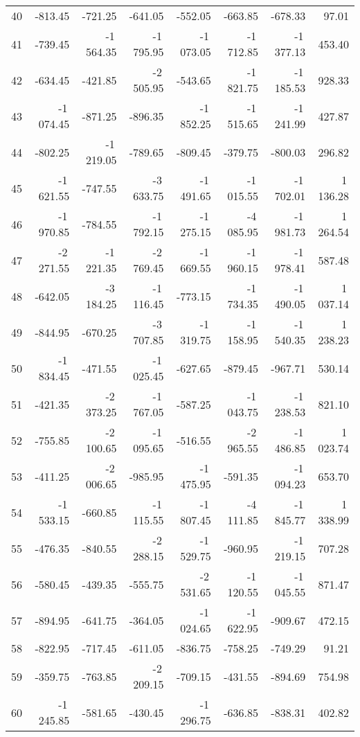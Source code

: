 \begin{longtable}{rrrrrrrr}
40 & -813.45 & -721.25 & -641.05 & -552.05 & -663.85 & -678.33 & 97.01  \\
41 & -739.45 & -1\,564.35 & -1\,795.95 & -1\,073.05 & -1\,712.85 & -1\,377.13 & 453.40  \\
42 & -634.45 & -421.85 & -2\,505.95 & -543.65 & -1\,821.75 & -1\,185.53 & 928.33  \\
43 & -1\,074.45 & -871.25 & -896.35 & -1\,852.25 & -1\,515.65 & -1\,241.99 & 427.87  \\
44 & -802.25 & -1\,219.05 & -789.65 & -809.45 & -379.75 & -800.03 & 296.82  \\
45 & -1\,621.55 & -747.55 & -3\,633.75 & -1\,491.65 & -1\,015.55 & -1\,702.01 & 1\,136.28  \\
46 & -1\,970.85 & -784.55 & -1\,792.15 & -1\,275.15 & -4\,085.95 & -1\,981.73 & 1\,264.54  \\
47 & -2\,271.55 & -1\,221.35 & -2\,769.45 & -1\,669.55 & -1\,960.15 & -1\,978.41 & 587.48  \\
48 & -642.05 & -3\,184.25 & -1\,116.45 & -773.15 & -1\,734.35 & -1\,490.05 & 1\,037.14  \\
49 & -844.95 & -670.25 & -3\,707.85 & -1\,319.75 & -1\,158.95 & -1\,540.35 & 1\,238.23  \\
50 & -1\,834.45 & -471.55 & -1\,025.45 & -627.65 & -879.45 & -967.71 & 530.14  \\
51 & -421.35 & -2\,373.25 & -1\,767.05 & -587.25 & -1\,043.75 & -1\,238.53 & 821.10  \\
52 & -755.85 & -2\,100.65 & -1\,095.65 & -516.55 & -2\,965.55 & -1\,486.85 & 1\,023.74  \\
53 & -411.25 & -2\,006.65 & -985.95 & -1\,475.95 & -591.35 & -1\,094.23 & 653.70  \\
54 & -1\,533.15 & -660.85 & -1\,115.55 & -1\,807.45 & -4\,111.85 & -1\,845.77 & 1\,338.99  \\
55 & -476.35 & -840.55 & -2\,288.15 & -1\,529.75 & -960.95 & -1\,219.15 & 707.28  \\
56 & -580.45 & -439.35 & -555.75 & -2\,531.65 & -1\,120.55 & -1\,045.55 & 871.47  \\
57 & -894.95 & -641.75 & -364.05 & -1\,024.65 & -1\,622.95 & -909.67 & 472.15  \\
58 & -822.95 & -717.45 & -611.05 & -836.75 & -758.25 & -749.29 & 91.21  \\
59 & -359.75 & -763.85 & -2\,209.15 & -709.15 & -431.55 & -894.69 & 754.98  \\
60 & -1\,245.85 & -581.65 & -430.45 & -1\,296.75 & -636.85 & -838.31 & 402.82  \\

\end{longtable}
